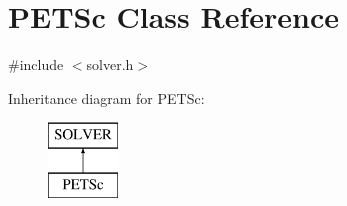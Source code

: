 \hypertarget{class_p_e_t_sc}{}\section{P\+E\+T\+Sc Class Reference}
\label{class_p_e_t_sc}


{\ttfamily \#include $<$solver.\+h$>$}

Inheritance diagram for P\+E\+T\+Sc\+:\begin{figure}[H]
\begin{center}
\leavevmode
\includegraphics[height=2.000000cm]{dd/d8d/class_p_e_t_sc}
\end{center}
\end{figure}
